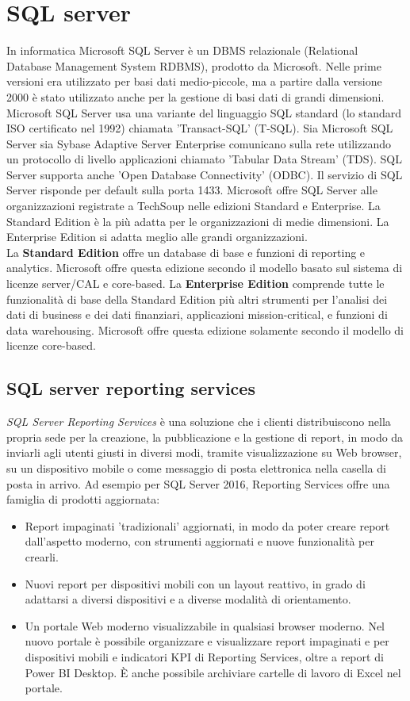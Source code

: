 \documentclass[12pt, a4paper, oneside]{book}
\begin{document}
\section{SQL server}
In informatica Microsoft SQL Server è un DBMS relazionale (Relational Database Management System RDBMS), prodotto da Microsoft. Nelle prime versioni era utilizzato per basi dati medio-piccole, ma a partire dalla versione 2000 è stato utilizzato anche per la gestione di basi dati di grandi dimensioni. Microsoft SQL Server usa una variante del linguaggio SQL standard (lo standard ISO certificato nel 1992) chiamata 'Transact-SQL' (T-SQL). Sia Microsoft SQL Server sia Sybase Adaptive Server Enterprise comunicano sulla rete utilizzando un protocollo di livello applicazioni chiamato 'Tabular Data Stream' (TDS). SQL Server supporta anche 'Open Database Connectivity' (ODBC). Il servizio di SQL Server risponde per default sulla porta 1433.
Microsoft offre SQL Server alle organizzazioni registrate a TechSoup nelle edizioni Standard e Enterprise. La Standard Edition è la più adatta per le organizzazioni di medie dimensioni. La Enterprise Edition si adatta meglio alle grandi organizzazioni.
\\La \textbf{Standard Edition} offre un database di base e funzioni di reporting e analytics. Microsoft offre questa edizione secondo il modello basato sul sistema di licenze server/CAL e core-based.
La \textbf{Enterprise Edition} comprende tutte le funzionalità di base della Standard Edition più altri strumenti per l'analisi dei dati di business e dei dati finanziari, applicazioni mission-critical, e funzioni di data warehousing. Microsoft offre questa edizione solamente secondo il modello di licenze core-based.
\subsection{SQL server reporting services}
\textit{SQL Server Reporting Services} è una soluzione che i clienti distribuiscono nella propria sede per la creazione, la pubblicazione e la gestione di report, in modo da inviarli agli utenti giusti in diversi modi, tramite visualizzazione su Web browser, su un dispositivo mobile o come messaggio di posta elettronica nella casella di posta in arrivo. Ad esempio per SQL Server 2016, Reporting Services offre una famiglia di prodotti aggiornata:
\begin{itemize}
	\item Report impaginati 'tradizionali' aggiornati, in modo da poter creare report dall'aspetto moderno, con strumenti aggiornati e nuove funzionalità per crearli.
	\item Nuovi report per dispositivi mobili con un layout reattivo, in grado di adattarsi a diversi dispositivi e a diverse modalità di orientamento.
	\item Un portale Web moderno visualizzabile in qualsiasi browser moderno. Nel nuovo portale è possibile organizzare e visualizzare report impaginati e per dispositivi mobili e indicatori KPI di Reporting Services, oltre a report di Power BI Desktop. È anche possibile archiviare cartelle di lavoro di Excel nel portale.
\end{itemize}
\end{document}
